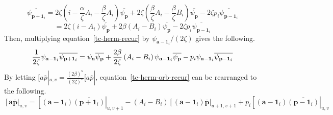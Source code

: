 \begin{equation}
  \overline{\psi_{\mathbf{p} + \mathbf{1}_i}} = 2\zeta\left(i - \frac{\alpha}{\zeta}A_i - \frac{\beta}{\zeta}A_i\right)\overline{\psi_{\mathbf{p}}} + 2\zeta\left(\frac{\beta}{\zeta}A_i - \frac{\beta}{\zeta}B_i\right)\overline{\psi_{\mathbf{p}}} - 2\zeta p_i\overline{\psi_{\mathbf{p} - \mathbf{1}_i}}
\end{equation}
\begin{equation}
  = 2\zeta\left(i - A_i\right)\overline{\psi_{\mathbf{p}}} + 2\beta\left(A_i - B_i\right)\overline{\psi_{\mathbf{p}}} - 2\zeta p_i\overline{\psi_{\mathbf{p} - \mathbf{1}_i}}
  \label{tc-herm-recur}
\end{equation}
Then, multiplying equation~\ref{tc-herm-recur} by $\psi_{\mathbf{a} - \mathbf{1}_i} / (2\zeta)$ gives the following.
\begin{equation}
  \frac{1}{2\zeta}\psi_{\mathbf{a} - \mathbf{1}_i}\overline{\psi_{\mathbf{p} + \mathbf{1}_i}} = \psi_{\mathbf{a}}\overline{\psi_{\mathbf{p}}} + \frac{2\beta}{2\zeta}\left(A_i - B_i\right)\psi_{\mathbf{a} - \mathbf{1}_i}\overline{\psi_{\mathbf{p}}} \\
  - p_i\psi_{\mathbf{a} - \mathbf{1}_i}\overline{\psi_{\mathbf{p} - \mathbf{1}_i}}
  \label{tc-herm-orb-recur}
\end{equation}
By letting $[a\overline{p}|_{u,v} = \frac{(2\beta)^u}{(2\zeta)^v}[a\overline{p}|$, equation~\ref{tc-herm-orb-recur} can be rearranged to the following.
\begin{equation}
  \left[\mathbf{a}\overline{\mathbf{p}}\right|_{u,v} = \left[\left(\mathbf{a} - \mathbf{1}_i\right)\overline{\left(\mathbf{p} + \mathbf{1}_i\right)}\right|_{u,v+1} - \left(A_i - B_i\right)\left[\left(\mathbf{a} - \mathbf{1}_i\right)\overline{\mathbf{p}}\right|_{u+1,v+1} + p_i\left[\left(\mathbf{a} - \mathbf{1}_i\right)\overline{\left(\mathbf{p} - \mathbf{1}_i\right)}\right|_{u,v}
  \label{tc-recur}
\end{equation}
